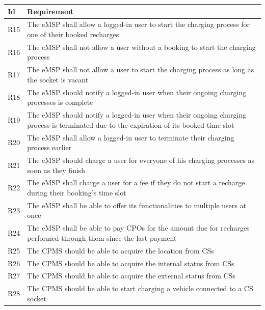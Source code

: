 \documentclass[11pt]{article}
\begin{document}
\begin{table}[H]
    \centering
    \setlength{\tabcolsep}{18pt}
    \renewcommand{\arraystretch}{1.2}
    \begin{tabularx}{\textwidth}{|>{\centering\hsize=0.1\hsize}X|>{\hsize=1.9\hsize}X|}
        \hline
        \textbf{Id} & \textbf{Requirement} \\
        \hline
        R15 & The eMSP shall allow a logged-in user to start the charging process for one of their booked recharges \\
        \hline
        R16 & The eMSP shall not allow a user without a booking to start the charging process \\
        \hline
        R17 & The eMSP shall not allow a user to start the charging process as long as the socket is vacant \\
        \hline
        R18 & The eMSP should notify a logged-in user when their ongoing charging processes is complete \\
        \hline
        R19 & The eMSP should notify a logged-in user when their ongoing charging process is terminated due to the expiration of its booked time slot \\
        \hline
        R20 & The eMSP shall allow a logged-in user to terminate their charging process earlier \\
        \hline
        R21 & The eMSP should charge a user for everyone of his charging processes as soon as they finish \\
        \hline
        R22 & The eMSP shall charge a user for a fee if they do not start a recharge during their booking's time slot \\
        \hline
        R23 & The eMSP shall be able to offer its functionalities to multiple users at once \\
        \hline
        R24 & The eMSP shall be able to pay CPOs for the amount due for recharges performed through them since the last payment \\
        \hline
        R25 & The CPMS should be able to acquire the location from CSs \\
        \hline
        R26 & The CPMS should be able to acquire the internal status from CSs \\
        \hline
        R27 & The CPMS should be able to acquire the external status from CSs \\
        \hline
        R28 & The CPMS should be able to start charging a vehicle connected to a CS socket \\

\end{tabularx}
\end{table}
\end{document}
